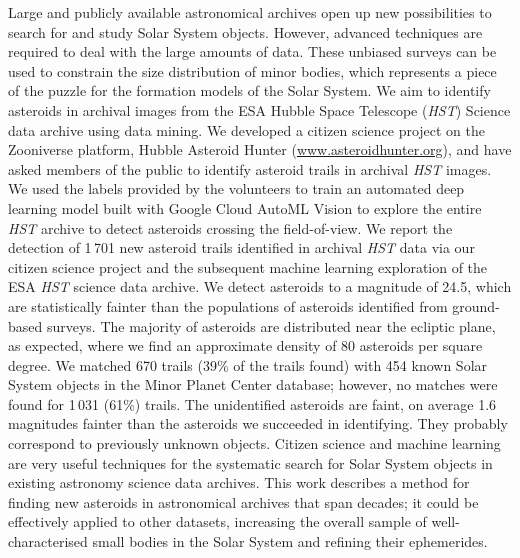 \documentclass{aa}
\begin{document}
  \abstract
  {Large and publicly available astronomical archives open up new possibilities to search for and study Solar System objects.  However, advanced techniques are required to deal with the large amounts of data. These unbiased surveys can be used to constrain the size distribution of minor bodies, which represents a piece of the puzzle for the formation models of the Solar System.}
   {We aim to identify asteroids in archival images from the ESA Hubble Space Telescope (\textit{HST}) Science data archive using data mining.}  
   {We developed a citizen science project on the Zooniverse platform, Hubble Asteroid Hunter (\url{www.asteroidhunter.org}), and have asked members of the public to identify asteroid trails in archival \textit{HST} images. We used the labels provided by the volunteers to train an automated deep learning model built with Google Cloud AutoML Vision to explore the entire \textit{HST} archive to detect asteroids crossing the field-of-view.}
   {We report the detection of 1\,701 new asteroid trails identified in archival \textit{HST} data via our citizen science project and the subsequent machine learning exploration of the ESA \textit{HST} science data archive. We detect asteroids to a magnitude of 24.5, which are statistically fainter than the populations of asteroids identified from ground-based surveys. The majority of asteroids are distributed near the ecliptic plane, as expected, where we find an approximate density of 80 asteroids per square degree. We matched 670 trails (39\% of the trails found) with 454 known Solar System objects in the Minor Planet Center database; however, no matches were found for 1\,031 (61\%) trails. The unidentified asteroids are faint, on average 1.6 magnitudes fainter than the asteroids we succeeded in identifying. They probably correspond to previously unknown objects.}
   {Citizen science and machine learning are very useful techniques for the systematic search for Solar System objects in existing astronomy science data archives. This work describes a method for finding new asteroids in astronomical archives that span decades; it could be effectively applied to other datasets, increasing the overall sample of well-characterised small bodies in the Solar System and refining their ephemerides.}

\end{document}
